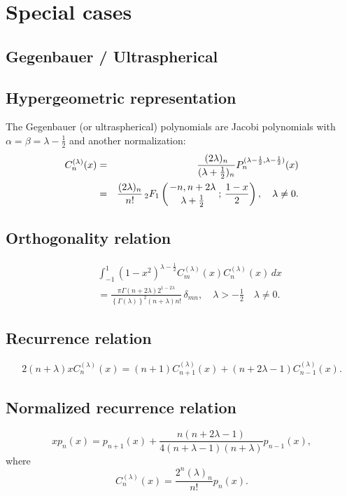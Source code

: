 \documentclass[envcountchap,graybox]{svmono}
\newcommand{\hyp}[5]{\mbox{}_{#1}{F}_{#2}
\left(\genfrac{}{}{0pt}{}{#3}{#4}\,;\,#5\right)}
\renewcommand{\Gamma}{\varGamma}
\begin{document}
\section*{Special cases}

\subsection{Gegenbauer / Ultraspherical}

\par

\subsection*{Hypergeometric representation}
The Gegenbauer (or ultraspherical) polynomials are Jacobi polynomials with
$\alpha=\beta=\lambda-\frac{1}{2}$ and another normalization:
\begin{eqnarray}
\label{DefGegenbauer}
C_n^{(\lambda)}(x)&=&\frac{(2\lambda)_n}{(\lambda+\frac{1}{2})_n}
P_n^{(\lambda-\frac{1}{2},\lambda-\frac{1}{2})}(x)\nonumber\\
&=&\frac{(2\lambda)_n}{n!}\,\hyp{2}{1}{-n,n+2\lambda}
{\lambda+\frac{1}{2}}{\frac{1-x}{2}},\quad\lambda\neq 0.
\end{eqnarray}

\subsection*{Orthogonality relation}
\begin{eqnarray}
\label{OrtGegenbauer}
& &\int_{-1}^1(1-x^2)^{\lambda-\frac{1}{2}}C_m^{(\lambda)}(x)C_n^{(\lambda)}(x)\,dx\nonumber\\
& &{}=\frac{\pi\Gamma(n+2\lambda)2^{1-2\lambda}}{\left\{\Gamma(\lambda)\right\}^2(n+\lambda)n!}\,\delta_{mn},
\quad\lambda>-\frac{1}{2}\quad\lambda\neq 0.
\end{eqnarray}

\subsection*{Recurrence relation}
\begin{equation}
\label{RecGegenbauer}
2(n+\lambda)xC_n^{(\lambda)}(x)=(n+1)C_{n+1}^{(\lambda)}(x)+(n+2\lambda-1)C_{n-1}^{(\lambda)}(x).
\end{equation}

\subsection*{Normalized recurrence relation}
\begin{equation}
\label{NormRecGegenbauer}
xp_n(x)=p_{n+1}(x)+\frac{n(n+2\lambda-1)}{4(n+\lambda-1)(n+\lambda)}p_{n-1}(x),
\end{equation}
where
$$C_n^{(\lambda)}(x)=\frac{2^n(\lambda)_n}{n!}p_n(x).$$
\end{document}
